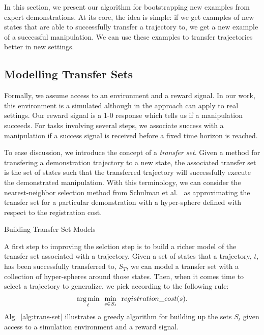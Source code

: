 In this section, we present our algorithm for bootstrapping new examples 
from expert demonstrations. At its core, the idea is simple: if we get
examples of new states that are able to successfully transfer a trajectory to,
we get a new example of a successful manipulation. We can use these examples
to transfer trajectories better in new settings.

\subsection{Modelling Transfer Sets}
Formally, we assume access to an environment and a reward signal. In our work, this
environment is a simulated although in the approach can apply to real settings. 
Our reward signal is a 1-0 response which tells us if a manipulation succeeds. For 
tasks involving several steps, we associate success with a manipulation if a success
signal is received before a fixed time horizon is reached.

To ease discussion, we introduce the concept of a \emph{transfer set}. Given a method for
transfering a demonstration trajectory to a new state, the associated transfer set is
the set of states such that the transferred trajectory will successfully execute the
demonstrated manipulation. With this terminology, we can consider the nearest-neighbor
selection method from Schulman et al.~\cite{Schulmanetal_ISRR2013} as approximating the
transfer set for a particular demonstration with a hyper-sphere defined with respect
to the registration cost.

\begin{algorithm}[H]
        
 \caption{Building Transfer Set Models}
 \label{alg:trans-set}
\end{algorithm}

A first step to improving the selction step is to build a richer
model of the transfer set associated with a trajectory. Given a set of
states that a trajectory, $t$,  has been successfully transferred to, $S_T$, we can
model a transfer set with a collection of hyper-spheres around those states.
Then, when it comes time to select a trajectory to generalize, we pick according to
the following rule:
\begin{equation}
\underset{t}{\operatorname*{arg\,min}} \ \ \underset{s\in S_t}{\min} \ \ {\text registration\_cost}(s).
\end{equation}
Alg.~\ref{alg:trans-set} illustrates a greedy algorithm for building up the sets $S_t$ given
access to a simulation environment and a reward signal. 

